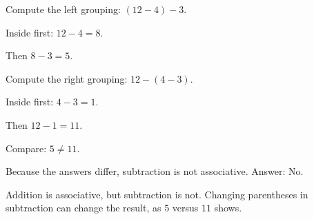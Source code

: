 \begin{steps}
  \item Compute the left grouping: $(12 - 4) - 3$.
  \item Inside first: $12 - 4 = 8$.
  \item Then $8 - 3 = 5$.
  \item Compute the right grouping: $12 - (4 - 3)$.
  \item Inside first: $4 - 3 = 1$.
  \item Then $12 - 1 = 11$.
  \item Compare: $5 \neq 11$.
  \item Because the answers differ, subtraction is not associative. Answer: No.
\end{steps}


\noindent Addition is associative, but subtraction is not. Changing parentheses
in subtraction can change the result, as $5$ versus $11$ shows.
